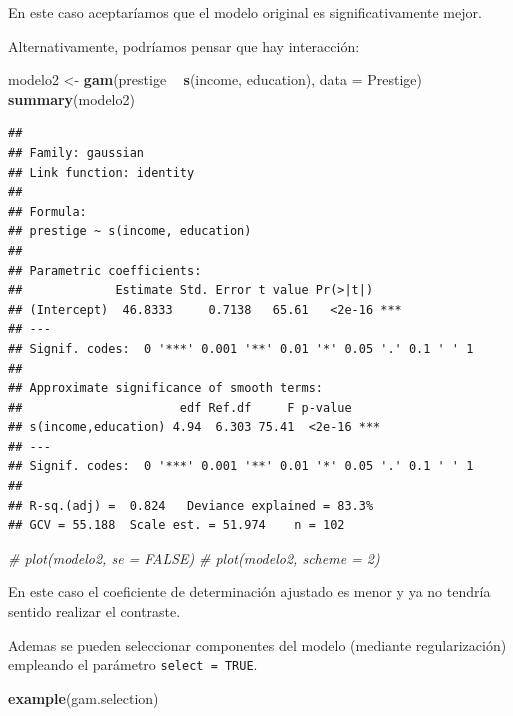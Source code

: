 \documentclass[
  spanish,
]{book}
\newenvironment{Shaded}{\begin{snugshade}}{\end{snugshade}}
\newcommand{\CommentTok}[1]{\textcolor[rgb]{0.56,0.35,0.01}{\textit{#1}}}
\newcommand{\DataTypeTok}[1]{\textcolor[rgb]{0.13,0.29,0.53}{#1}}
\newcommand{\KeywordTok}[1]{\textcolor[rgb]{0.13,0.29,0.53}{\textbf{#1}}}
\newcommand{\NormalTok}[1]{#1}
\newcommand{\OperatorTok}[1]{\textcolor[rgb]{0.81,0.36,0.00}{\textbf{#1}}}
\newcommand{\StringTok}[1]{\textcolor[rgb]{0.31,0.60,0.02}{#1}}
\theoremstyle{break}
\theoremstyle{definition}
\theoremstyle{definition}
\theoremstyle{definition}
\theoremstyle{remark}
\begin{document}
En este caso aceptaríamos que el modelo original es significativamente mejor.

Alternativamente, podríamos pensar que hay interacción:

\begin{Shaded}
\begin{Highlighting}[]
\NormalTok{modelo2 <-}\StringTok{ }\KeywordTok{gam}\NormalTok{(prestige }\OperatorTok{~}\StringTok{ }\KeywordTok{s}\NormalTok{(income, education), }\DataTypeTok{data =}\NormalTok{ Prestige)}
\KeywordTok{summary}\NormalTok{(modelo2)}
\end{Highlighting}
\end{Shaded}

\begin{verbatim}
## 
## Family: gaussian 
## Link function: identity 
## 
## Formula:
## prestige ~ s(income, education)
## 
## Parametric coefficients:
##             Estimate Std. Error t value Pr(>|t|)    
## (Intercept)  46.8333     0.7138   65.61   <2e-16 ***
## ---
## Signif. codes:  0 '***' 0.001 '**' 0.01 '*' 0.05 '.' 0.1 ' ' 1
## 
## Approximate significance of smooth terms:
##                      edf Ref.df     F p-value    
## s(income,education) 4.94  6.303 75.41  <2e-16 ***
## ---
## Signif. codes:  0 '***' 0.001 '**' 0.01 '*' 0.05 '.' 0.1 ' ' 1
## 
## R-sq.(adj) =  0.824   Deviance explained = 83.3%
## GCV = 55.188  Scale est. = 51.974    n = 102
\end{verbatim}

\begin{Shaded}
\begin{Highlighting}[]
\CommentTok{# plot(modelo2, se = FALSE)}
\CommentTok{# plot(modelo2, scheme = 2)}
\end{Highlighting}
\end{Shaded}

En este caso el coeficiente de determinación ajustado es menor y ya no tendría sentido realizar el contraste.

Ademas se pueden seleccionar componentes del modelo (mediante regularización) empleando el parámetro \texttt{select\ =\ TRUE}.

\begin{Shaded}
\begin{Highlighting}[]
\KeywordTok{example}\NormalTok{(gam.selection)}
\end{Highlighting}
\end{Shaded}
\end{document}
